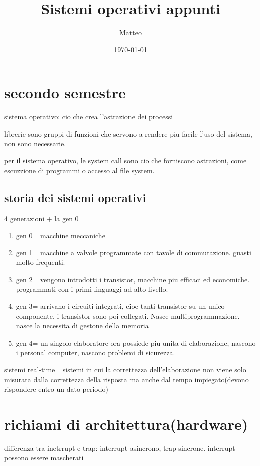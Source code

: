 \documentclass[12pt]{article}
\title{Sistemi operativi appunti}
\author{Matteo}
\date{\today}
\begin{document}
\maketitle

\section{secondo semestre}

sistema operativo: cio che crea l'astrazione dei processi

librerie sono gruppi di funzioni che servono a rendere piu facile l'uso del sistema, non sono necessarie.

per il sistema operativo, le system call sono cio che forniscono astrazioni, come escuzzione di programmi o accesso al file system.

\subsection{storia dei sistemi operativi}

4 generazioni + la gen 0
\begin{enumerate}
\item gen 0= macchine meccaniche
\item gen 1= macchine a valvole programmate con tavole di commutazione. guasti molto frequenti.
\item gen 2= vengono introdotti i transistor, macchine piu efficaci ed economiche. programmati con i primi linguaggi ad alto livello.
\item gen 3= arrivano i circuiti integrati, cioe tanti transistor su un unico componente, i transistor sono poi collegati. Nasce multiprogrammazione. nasce la necessita di gestone della memoria
\item gen 4= un singolo elaboratore ora possiede piu unita di elaborazione, nascono i personal computer, nascono problemi di sicurezza.

\end{enumerate}

sistemi real-time= sistemi in cui la correttezza dell'elaborazione non viene solo misurata dalla correttezza della risposta ma anche dal tempo impiegato(devono rispondere entro un dato periodo)

\section{richiami di architettura(hardware)}

differenza tra inetrrupt e trap: interrupt asincrono, trap sincrone. interrupt possono essere mascherati
\end{document}

